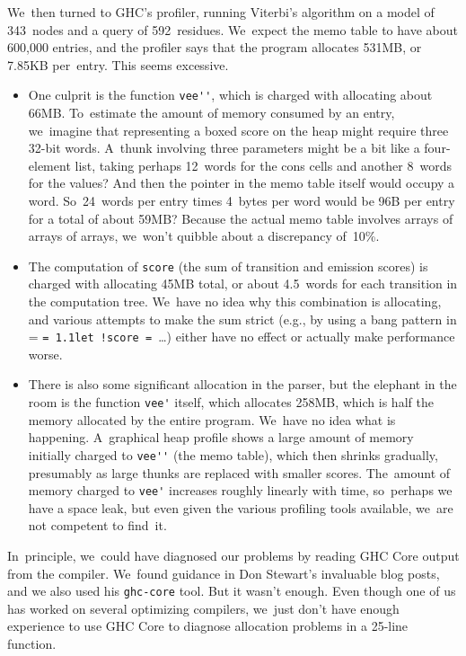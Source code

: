 \documentclass[]{jfp1}
\makeatletter
\newcommand{\mono}[1]{%
  {\@tempdima = \fontdimen2\font
   \texttt{\spaceskip = 1.1\@tempdima #1}}}
\makeatother
\begin{document}
We~then turned to GHC's profiler, running Viterbi's algorithm on a
model of 343~nodes and a query of 592~residues.
We~expect the memo table to have about 600,000 entries,
and the profiler says that the program allocates 531MB, or 7.85KB
per~entry.
This seems excessive.
\begin{itemize}
\item
One culprit is the function \verb+vee''+, which is charged with
allocating about 66MB.
To~estimate the amount of memory consumed by
an entry, we~imagine that representing a boxed
score on the heap might require three 32-bit words.
A~thunk involving three parameters might be a bit like a four-element
list, taking perhaps 12~words for the cons cells and another 8~words
for the values?
And then the pointer in the memo table itself would occupy a word.
So~24~words per entry times 4~bytes per word would be 96B per
entry for a total of about 59MB?
Because the actual memo table involves arrays of arrays of arrays,
we~won't quibble about a discrepancy of~10\%.
\item
The computation of \texttt{score} (the sum of transition 
and emission scores) is charged with allocating 45MB total, or about
4.5~words for each transition in the computation tree.
We~have no idea why this combination is allocating, and various
attempts to make the sum strict (e.g., by using a bang pattern in 
\mono{let~!score = }\ldots) either have no effect or actually make
performance worse.
\item
There is also some significant allocation in the parser, but the
elephant in the room is the function \verb+vee'+ itself, which
allocates 258MB, which is half the memory allocated by the entire
program.
We~have no idea what is happening.
A~graphical heap profile shows a large amount of memory initially
charged to \verb+vee''+ (the memo table), which then shrinks
gradually, presumably as large thunks are replaced with smaller
scores.
The~amount of memory charged to \verb+vee'+
increases roughly linearly with time, 
so~perhaps we have a space leak, but even given the various profiling
tools available, we~are not competent to find~it.
\end{itemize}
In~principle, we~could have diagnosed our problems by reading 
GHC Core output from the compiler.
We~found guidance in Don Stewart's invaluable blog posts,
and we also used his \texttt{ghc-core} tool.
But it wasn't enough.
Even though one of us has worked on several optimizing compilers, 
we~just don't have enough experience to use GHC Core to diagnose
allocation problems in a 25-line function.
\end{document}
